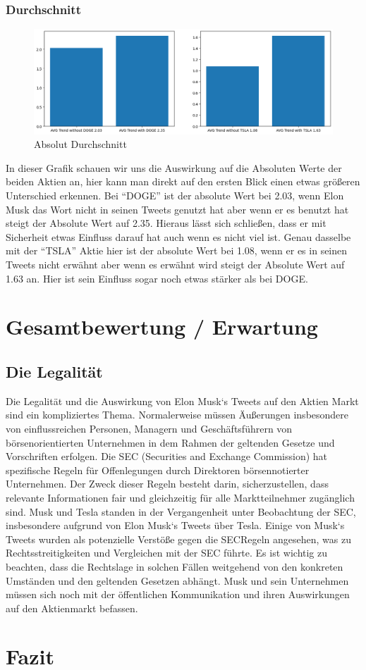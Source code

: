 \documentclass{article}
\begin{document}
\subsubsection{Durchschnitt}
\begin{figure}[!htb]
  	\includegraphics[width=\textwidth, center]{../imgs/Absolut_Durchschnitt.png}
 	\caption{Absolut Durchschnitt}
 	\label{fig:Absolut Durchschnitt}
\end{figure}
In dieser Grafik schauen wir uns die Auswirkung auf die Absoluten Werte der beiden Aktien an, hier kann man direkt auf den ersten Blick einen etwas größeren Unterschied erkennen.
Bei ``DOGE'' ist der absolute Wert bei 2.03, wenn Elon Musk das Wort nicht in seinen Tweets genutzt hat aber wenn er es benutzt hat steigt der Absolute Wert auf 2.35. Hieraus lässt sich schließen, dass er mit Sicherheit etwas Einfluss darauf hat auch wenn es nicht viel ist.
Genau dasselbe mit der ``TSLA'' Aktie hier ist der absolute Wert bei 1.08, wenn er es in seinen Tweets nicht erwähnt aber wenn es erwähnt wird steigt der Absolute Wert auf 1.63 an. Hier ist sein Einfluss sogar noch etwas stärker als bei DOGE.




\section{Gesamtbewertung / Erwartung}

\subsection{Die Legalität}
Die Legalität und die Auswirkung von Elon Musk`s Tweets auf den Aktien Markt sind ein kompliziertes
Thema. Normalerweise müssen Äußerungen insbesondere von einflussreichen Personen, Managern
und Geschäftsführern von börsenorientierten Unternehmen in dem Rahmen der geltenden Gesetze
und Vorschriften erfolgen.
Die SEC (Securities and Exchange Commission) hat spezifische Regeln für Offenlegungen durch
Direktoren börsennotierter Unternehmen. Der Zweck dieser Regeln besteht darin, sicherzustellen,
dass relevante Informationen fair und gleichzeitig für alle Marktteilnehmer zugänglich sind. Musk und
Tesla standen in der Vergangenheit unter Beobachtung der SEC, insbesondere aufgrund von Elon
Musk`s Tweets über Tesla. Einige von Musk`s Tweets wurden als potenzielle Verstöße gegen die SECRegeln angesehen, was zu Rechtsstreitigkeiten und Vergleichen mit der SEC führte. Es ist wichtig zu
beachten, dass die Rechtslage in solchen Fällen weitgehend von den konkreten Umständen und den
geltenden Gesetzen abhängt. Musk und sein Unternehmen müssen sich noch mit der öffentlichen
Kommunikation und ihren Auswirkungen auf den Aktienmarkt befassen.

\section{Fazit}
\end{document}
